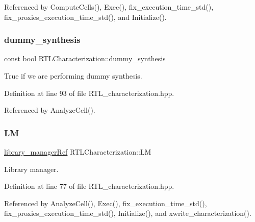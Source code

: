 Referenced by Compute\+Cells(), Exec(), fix\+\_\+execution\+\_\+time\+\_\+std(), fix\+\_\+proxies\+\_\+execution\+\_\+time\+\_\+std(), and Initialize().

\mbox{\label{classRTLCharacterization_a0490f2369c8d0e8399cda8d44059f143}} 
\subsubsection{\texorpdfstring{dummy\+\_\+synthesis}{dummy\_synthesis}}
{\footnotesize\ttfamily const bool R\+T\+L\+Characterization\+::dummy\+\_\+synthesis\hspace{0.3cm}{\ttfamily [private]}}



True if we are performing dummy synthesis. 



Definition at line 93 of file R\+T\+L\+\_\+characterization.\+hpp.



Referenced by Analyze\+Cell().

\mbox{\label{classRTLCharacterization_a19d1e3b24588c8c02cbf3270d9937d1b}} 
\subsubsection{\texorpdfstring{LM}{LM}}
{\footnotesize\ttfamily \hyperlink{library__manager_8hpp_aacc6d633b0aa80ecfeb1180fd480ae68}{library\+\_\+manager\+Ref} R\+T\+L\+Characterization\+::\+LM\hspace{0.3cm}{\ttfamily [private]}}



Library manager. 



Definition at line 77 of file R\+T\+L\+\_\+characterization.\+hpp.



Referenced by Analyze\+Cell(), Exec(), fix\+\_\+execution\+\_\+time\+\_\+std(), fix\+\_\+proxies\+\_\+execution\+\_\+time\+\_\+std(), Initialize(), and xwrite\+\_\+characterization().


